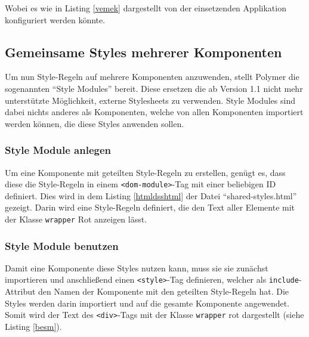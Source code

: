 

Wobei es wie in Listing \ref{vemek} dargestellt von der einsetzenden Applikation konfiguriert werden könnte.




\subsection{Gemeinsame Styles mehrerer Komponenten}\label{gemeinsame-styles-mehrerer-komponenten}

Um nun Style-Regeln auf mehrere Komponenten anzuwenden, stellt Polymer die sogenannten ``Style Modules'' bereit. Diese ersetzen die ab Version 1.1 nicht mehr unterstützte Möglichkeit, externe Stylesheets zu verwenden. Style Modules sind dabei nichts anderes als Komponenten, welche von allen Komponenten importiert werden können, die diese Styles anwenden sollen.


\subsubsection{Style Module anlegen}

Um eine Komponente mit geteilten Style-Regeln zu erstellen, genügt es, dass diese die Style-Regeln in einem \texttt{\textless{}dom-module\textgreater{}}-Tag mit einer beliebigen ID definiert. Dies wird in dem Listing \ref{htmldsshtml} der Datei ``shared-styles.html'' gezeigt. Darin wird eine Style-Regeln definiert, die den Text aller Elemente mit der Klasse \texttt{wrapper} Rot anzeigen lässt.




\subsubsection{Style Module benutzen}

Damit eine Komponente diese Styles nutzen kann, muss sie sie zunächst importieren und anschließend einen \texttt{\textless{}style\textgreater{}}-Tag definieren, welcher als \texttt{include}-Attribut den Namen der Komponente mit den geteilten Style-Regeln hat. Die Styles werden darin importiert und auf die gesamte Komponente angewendet. Somit wird der Text des \texttt{\textless{}div\textgreater{}}-Tags mit der Klasse \texttt{wrapper} rot dargestellt (siehe Listing \ref{besm}).

